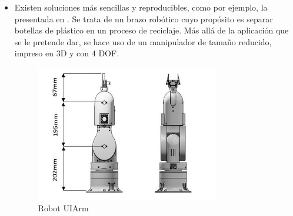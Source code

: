 \begin{itemize}
\begin{itemize}
        \item Tiene un espacio de trabajo muy amplio.
        \item Tener más de 3 grados de libertad le permiten alcanzar gran cantidad de puntos con distintas orientaciones.
        \item Según el artículo, tiene una capacidad de carga máxima de 12 kilogramos. A pesar de esto, se comenta que en la práctica el peso en el 
        extremo del robot debe ser menor a 5 Kg, por lo que su carga útil rondará los 3 Kg para un funcionamiento aceptable. Esto lo sitúa a la par 
        del robot comercial ABB IRB 120\footnote{\url{https://new.abb.com/products/es/3HAC031431-001/irb-120}}  
    \end{itemize}\
    
    En cambio, también se deben mencionar los siguientes puntos débiles:
    \begin{itemize}
        \item Carece de integración en \ac{ROS}, plataforma de desarrollo de la que se habla en \ref{subsec:ros2}
        \item Su coste en materiales supera los 1000 \euro \xspace por lo que no es lo suficientemente asequible para su uso académico.
        \item Según este artículo, se necesitan 200 horas para poder imprimir y montar el brazo, lo que implica que es costoso en tiempo 
        crear varias unidades y requiere de cierta habilidad para construirlo correctamente.
        \item En este artículo no se proporcionan los ficheros necesarios para poder replicarlo. Además, se menciona que las piezas han sido 
        diseñadas mediante el software privativo SolidWorks\textsuperscript{\tiny\textregistered} por lo que lo hace más difícil y costoso de editar.
    \end{itemize}\
    \newpage
    \item Existen soluciones más sencillas y reproducibles, como por ejemplo, la presentada en \cite{adediran2023uiarm}. Se trata de un brazo robótico 
    cuyo propósito es separar botellas de plástico en un proceso de reciclaje. Más allá de la aplicación que se le pretende dar, se hace uso de  
    un manipulador de tamaño reducido, impreso en 3D y con 4 \ac{DOF}.
    \begin{figure} [ht!]
        \begin{center}
          \includegraphics[width=8cm]{figs/uiarm.png}
        \end{center}
        \caption{Robot UIArm}
        \label{fig:uiarm}
    \end{figure}\ 
    

\end{itemize}
